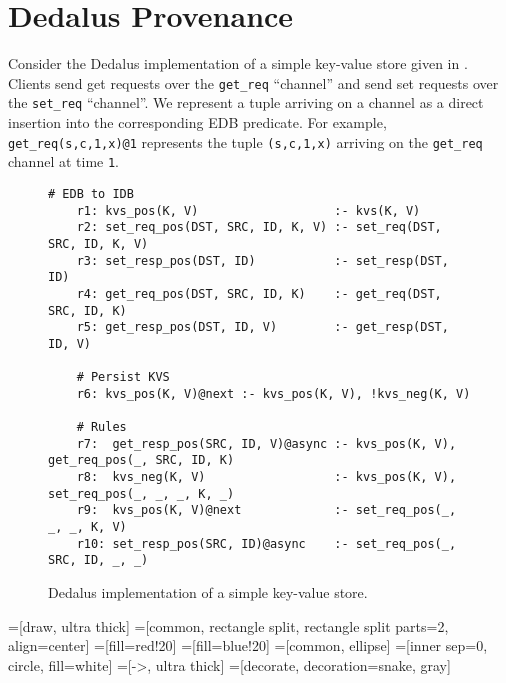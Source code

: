 \section{Dedalus Provenance}
Consider the Dedalus implementation of a simple key-value store given in
. Clients send get requests over the \texttt{get\_req}
``channel'' and send set requests over the \texttt{set\_req} ``channel''. We
represent a tuple arriving on a channel as a direct insertion into the
corresponding EDB predicate. For example, \texttt{get\_req(s,c,1,x)@1}
represents the tuple \texttt{(s,c,1,x)} arriving on the \texttt{get\_req}
channel at time \texttt{1}.

\begin{figure}[h]
  \centering
  \begin{Verbatim}[gobble=4]
    # EDB to IDB
    r1: kvs_pos(K, V)                   :- kvs(K, V)
    r2: set_req_pos(DST, SRC, ID, K, V) :- set_req(DST, SRC, ID, K, V)
    r3: set_resp_pos(DST, ID)           :- set_resp(DST, ID)
    r4: get_req_pos(DST, SRC, ID, K)    :- get_req(DST, SRC, ID, K)
    r5: get_resp_pos(DST, ID, V)        :- get_resp(DST, ID, V)

    # Persist KVS
    r6: kvs_pos(K, V)@next :- kvs_pos(K, V), !kvs_neg(K, V)

    # Rules
    r7:  get_resp_pos(SRC, ID, V)@async :- kvs_pos(K, V), get_req_pos(_, SRC, ID, K)
    r8:  kvs_neg(K, V)                  :- kvs_pos(K, V), set_req_pos(_, _, _, K, _)
    r9:  kvs_pos(K, V)@next             :- set_req_pos(_, _, _, K, V)
    r10: set_resp_pos(SRC, ID)@async    :- set_req_pos(_, SRC, ID, _, _)
  \end{Verbatim}
  \caption{Dedalus implementation of a simple key-value store.}
  \label{fig:dedalus-kvs}
\end{figure}

=[draw, ultra thick]
=[common, rectangle split, rectangle split parts=2, align=center]
=[fill=red!20]
=[fill=blue!20]
=[common, ellipse]
=[inner sep=0, circle, fill=white]
=[->, ultra thick]
=[decorate, decoration=snake, gray]
\newcommand{\tnode}[2]{\texttt{#1} \nodepart{second} \texttt{#2}}


